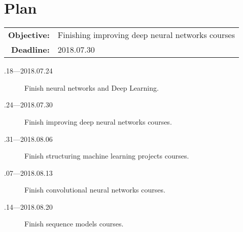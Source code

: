 \documentclass[a4paper]{article}
\begin{document}
\section{Plan}
\begin{tabular}{rl}
	\textbf{Objective:} & Finishing improving deep neural networks courses \\
	\textbf{Deadline:} & 2018.07.30
\end{tabular}

\begin{description}
	\item[.18---2018.07.24] Finish neural networks and Deep Learning.
	\item[.24---2018.07.30] Finish improving deep neural networks courses.
	\item[.31---2018.08.06] Finish structuring machine learning projects courses.
	\item[.07---2018.08.13] Finish convolutional neural networks courses.
	\item[.14---2018.08.20] Finish sequence models courses.
\end{description}



\end{document}
